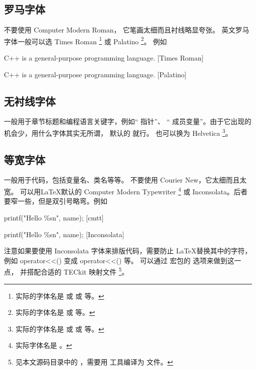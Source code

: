\subsection{罗马字体}
不要使用 {\selectfont Computer Modern Roman}，
它笔画太细而且衬线略显夸张。
英文罗马字体一般可以选 { Times Roman} 
\footnote{实际的字体名是  或  或  等。}
或 { Palatino}
\footnote{实际的字体名是  或  等。}。
例如
\begindot
\item { C++ is a general-purpose programming language. [Times Roman]}
\item { C++ is a general-purpose programming language. [Palatino]}
\myenddot

\subsection{无衬线字体}

一般用于章节标题和编程语言关键字，例如“ 指针”、
“ 成员变量”。由于它出现的机会少，用什么字体其实无所谓，
默认的  就行。
也可以换为 { Helvetica} 
\footnote{实际的字体名是  或  或  等。}。

\subsection{等宽字体}
一般用于代码，包括变量名、类名等等。
不要使用 { Courier New}，它太细而且太宽。
可以用\LaTeX 默认的 { Computer Modern Typewriter}
\footnote{实际字体名是 。} 
或 { Inconsolata}。后者要窄一些，但是双引号略弯。例如
\begindot
\item[] {\small {} printf("Hello \%s\bs n", name);} [cmtt]
\item[] {\small {} printf("Hello \%s\bs n", name);} [Inconsolata]
\myenddot

注意如果要使用 Inconsolata 字体来排版代码，需要防止 \LaTeX 替换其中的字符，
例如 { operator<<()} 变成 { operator<<()} 等。
可以通过  宏包的  选项来做到这一点，
并搭配合适的 TECkit 映射文件
\footnote{见本文源码目录中的 ，需要用  工具编译为  文件。}。

